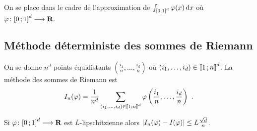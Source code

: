 On se place dans le cadre de l'approximation de $\int_{\mathopen{[}0\mathclose{}\mathpunct{};1\mathclose{]}^d} \varphi(x) \mathop{}\mathopen{}\mathrm{d} x$ où $\varphi \colon \mathopen{[}0\mathclose{}\mathpunct{};1\mathclose{]}^d \longrightarrow \mathbf{R}$.

\subsection{Méthode déterministe des sommes de Riemann}

	On se donne $n^d$ points équidistants $\left( \frac{i_1}{n},\ldots,\frac{i_d}{n} \right)$ où $(i_1,\ldots,i_d) \in \mathopen{}\mathclose{\left[\![1\mathclose{}\mathpunct{};n\right]\!]}^d$.
	La méthode des sommes de Riemann est
	$$I_n(\varphi) = \frac{1}{n^d} \sum_{(i_1,\ldots,i_d) \in \mathopen{}\mathclose{\left[\![1\mathclose{}\mathpunct{};n\right]\!]}^d} \varphi \left( \frac{i_1}{n},\ldots,\frac{i_d}{n} \right)\ .$$

	\begin{pop}
		Si $\varphi \colon \mathopen{[}0\mathclose{}\mathpunct{};1\mathclose{]}^d \longrightarrow \mathbf{R}$ est $L$-lipschitzienne alors $\left\lvert I_n(\varphi) - I(\varphi)\right\rvert \leq L \frac{\sqrt{d}}{n}$.
	\end{pop}

	
